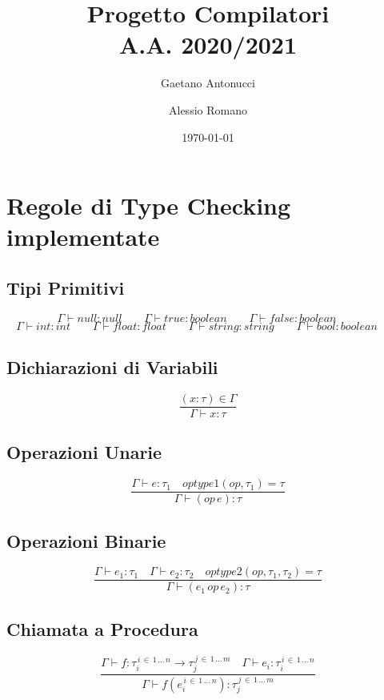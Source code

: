 \documentclass[a4paper,12pt]{article}
\title{Progetto Compilatori \\ \normalsize{A.A. 2020/2021}}
\author{Gaetano Antonucci \and Alessio Romano}
\date{\today}
\newcommand\mi[1]{\mathit{#1}}
\begin{document}
    \maketitle
    \tableofcontents
    \newpage
    
    \section{Regole di Type Checking implementate}
    \subsection{Tipi Primitivi}
    \[
        \Gamma \vdash null \colon null \qquad
        \Gamma \vdash true \colon boolean \qquad
        \Gamma \vdash false \colon boolean \qquad
    \]
    \[
        \Gamma \vdash \mi{int} \colon int \qquad
        \Gamma \vdash \mi{float} \colon float \qquad
        \Gamma \vdash \mi{string} \colon string \qquad
        \Gamma \vdash \mi{bool}    \colon boolean \qquad
    \]
    \subsection{Dichiarazioni di Variabili}
    \[
        \frac{(x \colon \tau) \in \Gamma}{\Gamma \vdash x \colon \tau}
    \]
    \subsection{Operazioni Unarie}
    \[
        \frac {\Gamma \vdash \mi{e} \colon \tau_1 \quad optype1(op,\tau_1) = \tau} %
              {\Gamma \vdash (op \, \mi{e}) \colon \tau}
    \]
    \subsection{Operazioni Binarie}
    \[
        \frac {\Gamma \vdash \mi{e_1} \colon \tau_1 \quad \Gamma \vdash \mi{e_2} \colon \tau_2  \quad optype2(op,\tau_1, \tau_2) = \tau} %
        {\Gamma \vdash (\mi{e_1}\, op \, \mi{e_2}) \colon \tau}
    \]
    \subsection{Chiamata a Procedura}
    \[
        \frac {\Gamma \vdash \mi{f} \colon \tau_i^{\,i \, \in \,1 \, \dots \, n} \to \tau_j^{\,j \, \in \, 1 \, \dots \, m} \quad \Gamma \vdash \mi{e_i} \colon %
        \tau_i^{\, i \, \in \, 1 \, \dots \, n}} %
        {\Gamma \vdash \mi{f}(\mi{e}_i^{\, i \, \in \, 1 \, \dots \, n})\colon \tau_j^{\, j \, \in \, 1 \, \dots \, m}}
    \]
    
\end{document}
